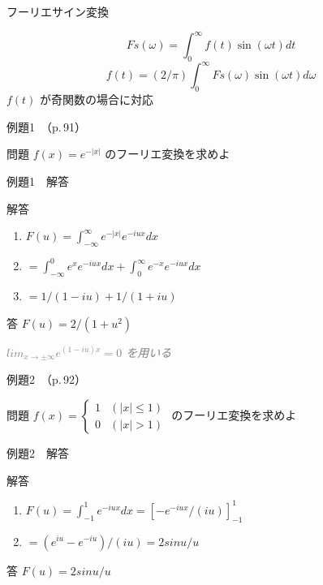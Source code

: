\documentclass[aspectratio=43,professionalfonts,handout]{beamer}
\begin{document}
\begin{frame}{フーリエサイン変換}
  \begin{block}{}
  \[
    Fs(\omega) = \int_{0}^\infty f(t)\sin(\omega t) dt
  \]
  \[
    f(t) = (2/\pi) \int_{0}^\infty Fs(\omega)\sin(\omega t) d\omega
  \]
  {\footnotesize $f(t)$ が奇関数の場合に対応}
  \end{block}
\end{frame}

\begin{frame}{例題1　（p.\,91）}
  \begin{exampleblock}{問題}
    $f(x) = e^{-|x|}$ のフーリエ変換を求めよ\\[2pt]
  \end{exampleblock}
\end{frame}

\begin{frame}{例題1　解答}
  \begin{exampleblock}{解答}
  \begin{enumerate}[1.]
    \item[] $F(u) = \int_{-\infty}^{\infty} e^{-|x|} e^{-iux} dx$
    \item[] $= \int_{-\infty}^{0} e^{x} e^{-iux} dx + \int_{0}^{\infty} e^{-x} e^{-iux} dx$
    \item[] $= 1/(1-iu) + 1/(1+iu)$
  \end{enumerate}
  \end{exampleblock}
  \begin{alertblock}{答}
    $F(u) = 2/(1+u^{2})$
  \end{alertblock}
  {\footnotesize \textcolor{gray}{\textit{$lim_{x \to ±\infty} e^{(1-iu)x} = 0$ を用いる}}}
\end{frame}

\begin{frame}{例題2　（p.\,92）}
  \begin{exampleblock}{問題}
    $f(x) = \begin{cases} 1 & (|x| \leq 1) \\ 0 & (|x| > 1) \end{cases}$ のフーリエ変換を求めよ\\[2pt]
  \end{exampleblock}
\end{frame}

\begin{frame}{例題2　解答}
  \begin{exampleblock}{解答}
  \begin{enumerate}[1.]
    \item[] $F(u) = \int_{-1}^{1} e^{-iux} dx = [-e^{-iux}/(iu)]_{-1}^{1}$
    \item[] $= (e^{iu} - e^{-iu})/(iu) = 2sin u / u$
  \end{enumerate}
  \end{exampleblock}
  \begin{alertblock}{答}
    $F(u) = 2sin u / u$
  \end{alertblock}
\end{frame}
\end{document}
